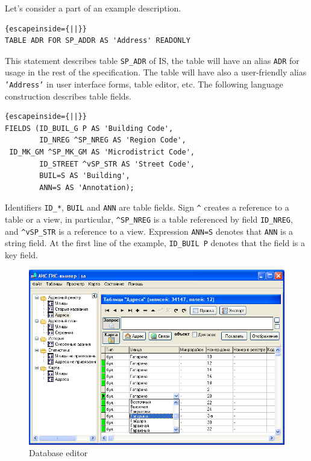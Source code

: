 \documentclass[conference]{IEEEtran}
\begin{document}
Let's consider a part of an example description.

\begin{lstlisting}{escapeinside={||}}
TABLE ADR FOR SP_ADDR AS 'Address' READONLY
\end{lstlisting}%

This statement describes table \texttt{SP\_ADR} of IS, the table will have an alias \texttt{ADR} for usage in the rest of the specification.  The table will have also a user-friendly alias \texttt{'Address'} in user interface forms, table editor, etc.  The following language construction describes table fields.

\begin{lstlisting}{escapeinside={||}}
FIELDS (ID_BUIL_G P AS 'Building Code',
        ID_NREG ^SP_NREG AS 'Region Code',
 ID_MK_GM ^SP_MK_GM AS 'Microdistrict Code',
        ID_STREET ^vSP_STR AS 'Street Code',
        BUIL=S AS 'Building',
        ANN=S AS 'Annotation);
\end{lstlisting}%

Identifiers \texttt{ID\_*}, \texttt{BUIL} and \texttt{ANN} are table fields.  Sign \texttt{\^} creates a reference to a table or a view, in particular, \texttt{\^{}SP\_NREG} is a table referenced by field \texttt{ID\_NREG}, and \texttt{\^{}vSP\_STR} is a reference to a view.  Expression \texttt{ANN=S} denotes that \texttt{ANN} is a string field.  At the first line of the example, \texttt{ID\_BUIL P} denotes that the field is a key field.

\begin{figure}[b]
  \centering
  \includegraphics[width=\linewidth]{dbeditor.png}
  \caption{Database editor}
  \label{fig:dbeditor}
\end{figure}
\end{document}
